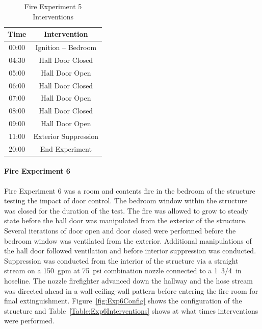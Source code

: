 \documentclass[12pt,oneside]{book}
\begin{document}
\begin{table}[H]
	\centering
	\caption{Fire Experiment 5 Interventions}
	\begin{tabular}{|c|c|} 
		\hline
		Time & Intervention \\ \hline \hline
		00:00 & Ignition -- Bedroom \\ \hline
		04:30 & Hall Door Closed \\ \hline
		05:00 & Hall Door Open \\ \hline
		06:00 & Hall Door Closed \\ \hline
		07:00 & Hall Door Open \\ \hline
		08:00 & Hall Door Closed \\ \hline
		09:00 & Hall Door Open \\ \hline
		11:00 & Exterior Suppression \\ \hline
		20:00 & End Experiment\\ \hline
	\end{tabular}
	\label{Table:Exp5Interventions}
\end{table}

\clearpage

\paragraph{Fire Experiment 6} \mbox{}

Fire Experiment 6 was a room and contents fire in the bedroom of the structure testing the impact of door control. The bedroom window within the structure was closed for the duration of the test. The fire was allowed to grow to steady state before the hall door was manipulated from the exterior of the structure. Several iterations of door open and door closed were performed before the bedroom window was ventilated from the exterior. Additional manipulations of the hall door followed ventilation and before interior suppression was conducted. Suppression was conducted from the interior of the structure via a straight stream on a 150~gpm at 75~psi combination nozzle connected to a 1~3/4~in hoseline. The nozzle firefighter advanced down the hallway and the hose stream was directed ahead in a wall-ceiling-wall pattern before entering the fire room for final extinguishment. Figure~\ref{fig:Exp6Config} shows the configuration of the structure and Table~\ref{Table:Exp6Interventions} shows at what times interventions were performed.

\end{document}
